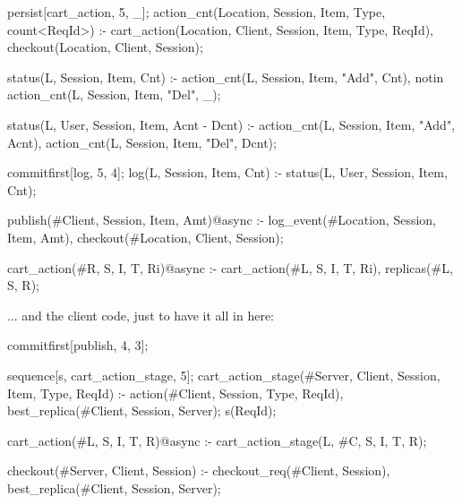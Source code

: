 \begin{Dedalus}
persist[cart_action, 5, _];
action_cnt(Location, Session, Item, Type, count<ReqId>) :-
    cart_action(Location, Client, Session, Item, Type, ReqId),
    checkout(Location, Client, Session);

status(L, Session, Item, Cnt) :-
    action_cnt(L, Session, Item, "Add", Cnt),
    notin action_cnt(L, Session, Item, "Del", _);

status(L, User, Session, Item, Acnt - Dcnt) :-
    action_cnt(L, Session, Item, "Add", Acnt),
    action_cnt(L, Session, Item, "Del", Dcnt);

commitfirst[log, 5, 4];
log(L, Session, Item, Cnt) :- 
    status(L, User, Session, Item, Cnt);

publish(#Client, Session, Item, Amt)@async :-
    log_event(#Location, Session, Item, Amt),
    checkout(#Location, Client, Session);

cart_action(#R, S, I, T, Ri)@async :-
    cart_action(#L, S, I, T, Ri),
    replicas(#L, S, R);
\end{Dedalus}


... and the client code, just to have it all in here:

\begin{Dedalus}
commitfirst[publish, 4, 3];

sequence[s, cart_action_stage, 5];
cart_action_stage(#Server, Client, Session, Item, Type, ReqId) :-
    action(#Client, Session, Type, ReqId),
    best_replica(#Client, Session, Server);
    s(ReqId);

cart_action(#L, S, I, T, R)@async :- 
    cart_action_stage(L, #C, S, I, T, R);

checkout(#Server, Client, Session) :-
    checkout_req(#Client, Session),
    best_replica(#Client, Session, Server);
\end{Dedalus}


